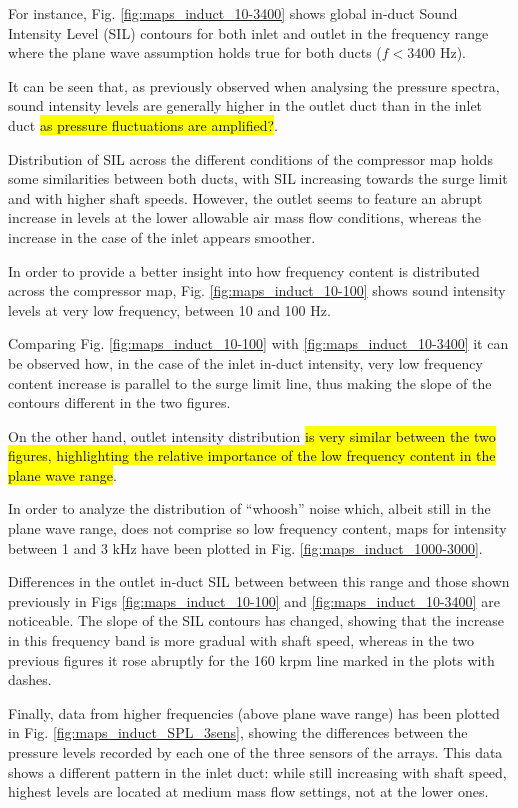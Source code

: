 For instance, Fig. \ref{fig:maps_induct_10-3400} shows global in-duct Sound Intensity Level (SIL) contours for both inlet and outlet in the frequency range where the plane wave assumption holds true for both ducts ($f<3400$ Hz). 

It can be seen that, as previously observed when analysing the pressure spectra, sound intensity levels are generally higher in the outlet duct than in the inlet duct \hl{as pressure fluctuations are amplified?}. 

Distribution of SIL across the different conditions of the compressor map holds some similarities between both ducts, with SIL increasing towards the surge limit and with higher shaft speeds. However, the outlet seems to feature an abrupt increase in levels at the lower allowable air mass flow conditions, whereas the increase in the case of the inlet appears smoother. 

In order to provide a better insight into how frequency content is distributed across the compressor map, Fig. \ref{fig:maps_induct_10-100} shows sound intensity levels at very low frequency, between 10 and 100 Hz.

Comparing Fig. \ref{fig:maps_induct_10-100} with \ref{fig:maps_induct_10-3400} it can be observed how, in the case of the inlet in-duct intensity, very low frequency content increase is parallel to the surge limit line, thus making the slope of the contours different in the two figures.

On the other hand, outlet intensity distribution \hl{is very similar between the two figures, highlighting the relative importance of the low frequency content in the plane wave range}.

In order to analyze the distribution of ``whoosh'' noise which, albeit still in the plane wave range, does not comprise so low frequency content, maps for intensity between 1 and 3 kHz have been plotted in Fig. \ref{fig:maps_induct_1000-3000}.

Differences in the outlet in-duct SIL between between this range and those shown previously in Figs \ref{fig:maps_induct_10-100} and \ref{fig:maps_induct_10-3400} are noticeable. The slope of the SIL contours has changed, showing that the increase in this frequency band is more gradual with shaft speed, whereas in the two previous figures it rose abruptly for the 160 krpm line marked in the plots with dashes.

Finally, data from higher frequencies (above plane wave range) has been plotted in Fig. \ref{fig:maps_induct_SPL_3sens}, showing the differences between the pressure levels recorded by each one of the three sensors of the arrays. This data shows a different pattern in the inlet duct: while still increasing with shaft speed, highest levels are located at medium mass flow settings, not at the lower ones.

